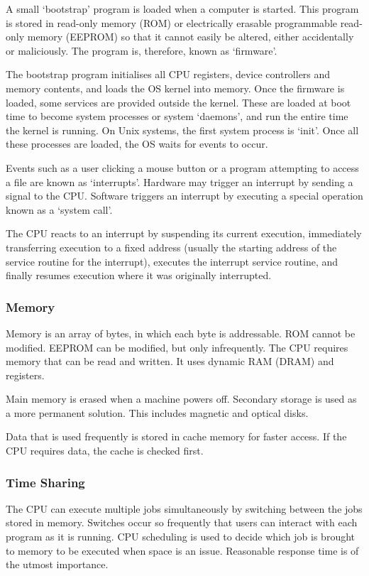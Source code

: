 A small `bootstrap' program is loaded when a computer is started.
This program is stored in read-only memory (ROM) or electrically erasable programmable read-only memory (EEPROM) so that it cannot easily be altered, either accidentally or maliciously.
The program is, therefore, known as `firmware'.

The bootstrap program initialises all CPU registers, device controllers and memory contents, and loads the OS kernel into memory.
Once the firmware is loaded, some services are provided outside the kernel.
These are loaded at boot time to become system processes or system `daemons', and run the entire time the kernel is running.
On Unix systems, the first system process is `init'.
Once all these processes are loaded, the OS waits for events to occur.

Events such as a user clicking a mouse button or a program attempting to access a file are known as `interrupts'.
Hardware may trigger an interrupt by sending a signal to the CPU\@.
Software triggers an interrupt by executing a special operation known as a `system call'.

The CPU reacts to an interrupt by suspending its current execution, immediately transferring execution to a fixed address (usually the starting address of the service routine for the interrupt), executes the interrupt service routine, and finally resumes execution where it was originally interrupted.

\subsubsection{Memory}

Memory is an array of bytes, in which each byte is addressable.
ROM cannot be modified.
EEPROM can be modified, but only infrequently.
The CPU requires memory that can be read and written.
It uses dynamic RAM (DRAM) and registers.

Main memory is erased when a machine powers off.
Secondary storage is used as a more permanent solution.
This includes magnetic and optical disks.

Data that is used frequently is stored in cache memory for faster access.
If the CPU requires data, the cache is checked first.

\subsubsection{Time Sharing}

The CPU can execute multiple jobs simultaneously by switching between the jobs stored in memory.
Switches occur so frequently that users can interact with each program as it is running.
CPU scheduling is used to decide which job is brought to memory to be executed when space is an issue.
Reasonable response time is of the utmost importance.

